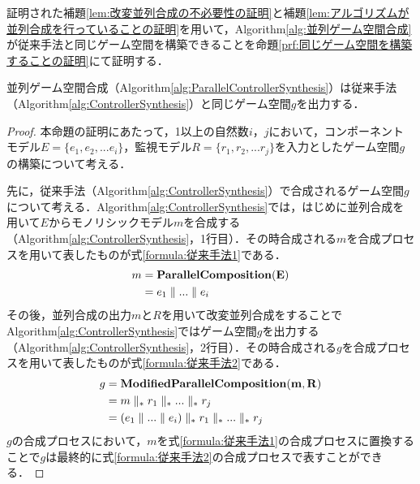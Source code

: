 証明された補題\ref{lem:改変並列合成の不必要性の証明}と補題\ref{lem:アルゴリズムが並列合成を行っていることの証明}を用いて，Algorithm\ref{alg:並列ゲーム空間合成}が従来手法と同じゲーム空間を構築できることを命題\ref{prf:同じゲーム空間を構築することの証明}にて証明する．
\begin{pro}
    \label{prf:同じゲーム空間を構築することの証明}
    並列ゲーム空間合成（Algorithm\ref{alg:ParallelControllerSynthesis}）は従来手法（Algorithm\ref{alg:ControllerSynthesis}）と同じゲーム空間$g$を出力する．
\end{pro}
\begin{proof}
    本命題の証明にあたって，1以上の自然数$i$，$j$において，コンポーネントモデル$E = \{e_1, e_2, ... e_i\}$，監視モデル$R = \{r_1, r_2, ... r_j\}$を入力としたゲーム空間$g$の構築について考える．
    
    先に，従来手法（Algorithm\ref{alg:ControllerSynthesis}）で合成されるゲーム空間$g$について考える．Algorithm\ref{alg:ControllerSynthesis}では，はじめに並列合成を用いて$E$からモノリシックモデル$m$を合成する（Algorithm\ref{alg:ControllerSynthesis}，1行目）．その時合成される$m$を合成プロセスを用いて表したものが式\ref{formula:従来手法1}である．
    \renewcommand{\baselinestretch}{0.0}
    \allowdisplaybreaks[4]
    \begin{align}
    \label{formula:従来手法1}
    m &= {\bf Parallel Composition(E)} \notag\\
      &= e_1 \parallel ... \parallel e_i
    \end{align}
    \allowdisplaybreaks[0]
    \renewcommand{\baselinestretch}{1}
    その後，並列合成の出力$m$と$R$を用いて改変並列合成をすることでAlgorithm\ref{alg:ControllerSynthesis}ではゲーム空間$g$を出力する（Algorithm\ref{alg:ControllerSynthesis}，2行目）．その時合成される$g$を合成プロセスを用いて表したものが式\ref{formula:従来手法2}である．
    \renewcommand{\baselinestretch}{0.0}
    \allowdisplaybreaks[4]
    \begin{align}
    \label{formula:従来手法2}
    g &= {\bf Modified Parallel Composition(m,R)} \notag\\
      &= m \parallel_* r_1 \parallel_* ... \parallel_* r_j \notag\\
      &= (e_1 \parallel ... \parallel e_i) \parallel_* r_1 \parallel_* ... \parallel_* r_j
    \end{align}
    \allowdisplaybreaks[0]
    \renewcommand{\baselinestretch}{1}
    $g$の合成プロセスにおいて，$m$を式\ref{formula:従来手法1}の合成プロセスに置換することで$g$は最終的に式\ref{formula:従来手法2}の合成プロセスで表すことができる．


\end{proof}

